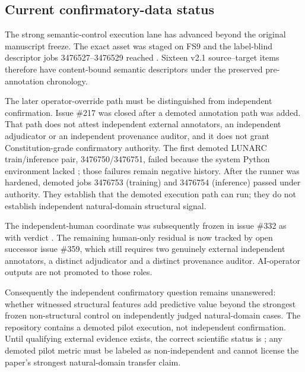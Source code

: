 \subsection{Current confirmatory-data status}

The strong semantic-control execution lane has advanced beyond the original
manuscript freeze. The exact  asset was staged
on FS9 and the label-blind descriptor jobs 3476527--3476529 reached
. Sixteen v2.1 source--target items therefore
have content-bound semantic descriptors under the preserved pre-annotation
chronology.

The later operator-override path must be distinguished from independent
confirmation. Issue \#217 was closed after a demoted
 annotation path was added. That path does
not attest independent external annotators, an independent adjudicator or an
independent provenance auditor, and it does not grant Constitution-grade
confirmatory authority. The first demoted LUNARC train/inference pair,
3476750/3476751, failed because the system Python environment lacked
; those failures remain negative history. After the runner was
hardened, demoted jobs 3476753 (training) and 3476754 (inference) passed under
 authority. They establish that the demoted execution
path can run; they do not establish independent natural-domain structural
signal.

The independent-human coordinate was subsequently frozen in issue \#332 as
 with verdict
. The
remaining human-only residual is now tracked by open successor issue \#359,
which still requires two genuinely external independent annotators, a distinct
adjudicator and a distinct provenance auditor. AI-operator outputs are not
promoted to those roles.

Consequently the independent confirmatory question remains unanswered: whether
witnessed structural features add predictive value beyond the strongest frozen
non-structural control on independently judged natural-domain cases. The
repository contains a demoted pilot execution, not independent confirmation.
Until qualifying external evidence exists, the correct scientific status is
; any demoted pilot metric must be labeled
as non-independent and cannot license the paper's strongest natural-domain
transfer claim.


